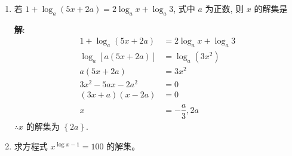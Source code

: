 \documentclass{report}
\newcommand{\sol}{\vspace{0.2cm}\textbf{解}:}
\begin{document}
\begin{multicols*}{2}
\begin{enumerate}[leftmargin=*]
              \sol{}
              \begin{align*}
                  \log_4 x + \left(\log_4 x\right)^2          & + \left(\log_4 x\right)^3 + \left(\log_4 x\right)^4 + \cdots  = 1 \\
                  \sum_{n=1}^{\infty} \left(\log_4 x\right)^n & = 1                                                               \\
                  \dfrac{\log_4 x}{1 - \log_4 x}              & = 1                                                               \\
                  \log_4 x                                    & = 1 - \log_4 x                                                    \\
                  2 \log_4 x                                  & = 1                                                               \\
                  \log_4 x                                    & = \dfrac{1}{2}                                                    \\
                  x                                           & = 4^{\frac{1}{2}}                                                 \\
                                                              & = 2
              \end{align*}

        \item 若 $1+\log _a(5 x+2 a)=2 \log _a x+\log _a 3$, 式中 $a$ 为正数, 则 $x$ 的解集是

              \sol{}
              \begin{align*}
                  1 + \log_a(5x + 2a) & = 2 \log_a x + \log_a 3 \\
                  \log_a [a(5x + 2a)] & = \log_a (3x^2)         \\
                  a(5x + 2a)          & = 3x^2                  \\
                  3x^2 - 5ax - 2a^2   & = 0                     \\
                  (3x + a)(x - 2a)    & = 0                     \\
                  x                   & = -\dfrac{a}{3}, 2a
              \end{align*}
              $\therefore x$ 的解集为 $\left\{2a\right\}$.

        \item 求方程式 $x^{\log x-1}=100$ 的解集。


\end{enumerate}
\end{multicols*}
\end{document}

